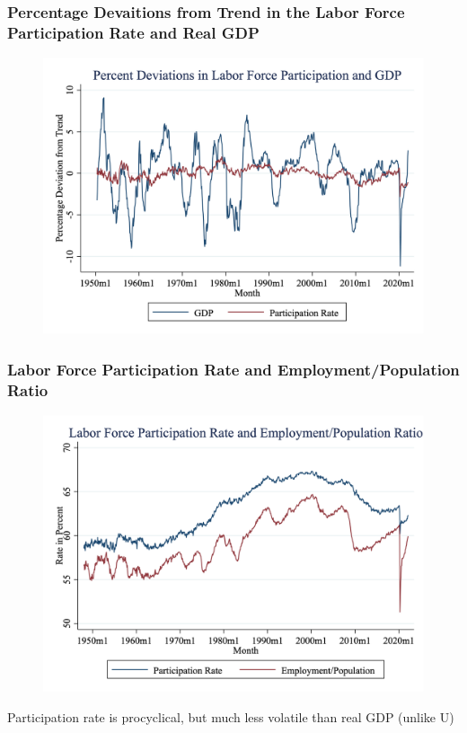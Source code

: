 \documentclass{beamer}
\begin{document}
\begin{frame}
\frametitle[alignment=center]{Percentage Devaitions from Trend in the Labor Force Participation Rate and Real GDP}
\begin{figure}
\centering
\includegraphics[scale=0.25]{Figures/Fig_6pt5.png}
\end{figure}
\end{frame}

\begin{frame}
\frametitle[alignment=center]{Labor Force Participation Rate and Employment/Population Ratio}
\begin{figure}
\centering
\includegraphics[scale=0.25]{Figures/Fig_6pt6.png}
\end{figure}
Participation rate is procyclical, but much less volatile than real GDP (unlike U)
\end{frame}
\end{document}

